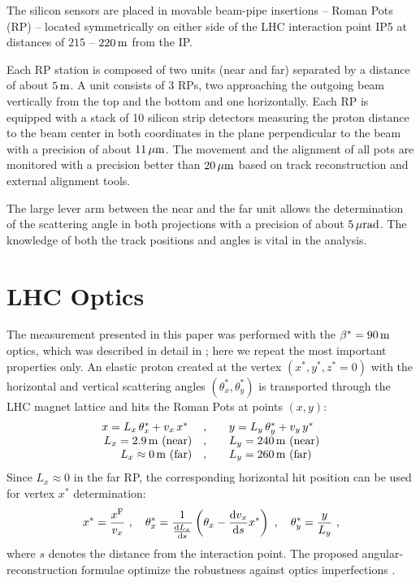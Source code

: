 \documentclass[doublecol]{../macros/epl2}
\def\d{{\rm d}}
\def\un#1{\,{\rm #1}}
\begin{document}
The silicon sensors are placed in movable beam-pipe insertions -- Roman Pots (RP) -- located symmetrically on either side of the LHC interaction point IP5 at distances of $215$ -- $220\un{m}$ from the IP.

Each RP station is composed of two units (near and far) separated by a distance of about $5\un{m}$. A unit consists of 3 RPs, two approaching the outgoing beam vertically from the top and the bottom and one horizontally. Each RP is equipped with a stack of 10 silicon strip detectors measuring the proton distance to the beam center in both coordinates in the plane perpendicular to the beam with a precision of about $11\un{\mu m}$.
The movement and the alignment of all pots are monitored with a precision better than $20\un{\mu m}$ based on track reconstruction and external alignment tools.

The large lever arm between the near and the far unit allows the determination of the scattering angle in both projections with a precision of about $5\un{\mu rad}$. The knowledge of both the track positions and angles is vital in the analysis. 



\section{LHC Optics}

The measurement presented in this paper was performed with the $\beta^*=90\un{m}$ optics, which was described in detail in \cite{epl96}; here we repeat the most important properties only. An elastic proton created at the vertex $(x^*, y^*, z^*=0)$ with the horizontal and vertical scattering angles $(\theta_x^*, \theta_y^*)$ is transported through the LHC magnet lattice and hits the Roman Pots at points $(x, y)$:
\begin{equation}
\label{eq:transport}
\begin{array}{rcl}
x = L_x\,\theta^*_x + v_x\,x^*\ &,\quad& y = L_y\,\theta^*_y + v_y\,y^* \\
L_x = 2.9\un{m} \hbox{ (near)}&,\quad& L_y = 240\un{m} \hbox{ (near)}\\
L_x \approx 0\un{m} \hbox{ (far)}&,\quad& L_y = 260\un{m}\hbox{ (far)}\\
\end{array}
\end{equation}
Since $L_x \approx 0$ in the far RP, the corresponding horizontal hit position can be used for vertex $x^*$ determination:
\begin{equation}
\label{eq:reconstruction}
x^* = {x^{\rm F}\over v_x}\ ,\quad
\theta^*_x = {1\over {\d L_x\over \d s}} \left( \theta_x - {\d v_x\over \d s} x^* \right)\ ,\quad
\theta^*_y = {y\over L_y}\ ,
\end{equation}
where $s$ denotes the distance from the interaction point. The proposed angular-reconstruction formulae optimize the robustness against optics imperfections \cite{epl96}.
\end{document}
